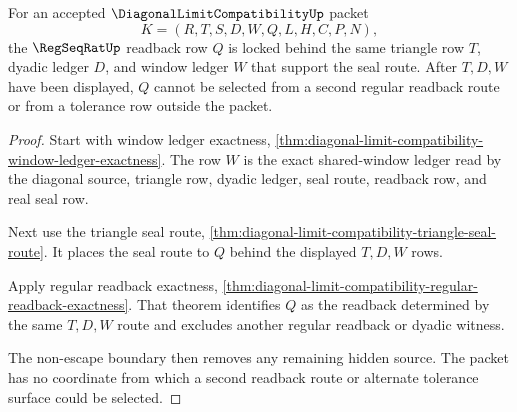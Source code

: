 \begin{theorem}
\label{thm:diagonal-limit-compatibility-triangle-readback-lock}
For an accepted $\DiagonalLimitCompatibilityUp$ packet
$$
K=(R,T,S,D,W,Q,L,H,C,P,N),
$$
the $\RegSeqRatUp$ readback row $Q$ is locked behind the same triangle row
$T$, dyadic ledger $D$, and window ledger $W$ that support the seal route.
After $T,D,W$ have been displayed, $Q$ cannot be selected from a second
regular readback route or from a tolerance row outside the packet.
\end{theorem}
\begin{proof}
Start with window ledger exactness,
\autoref{thm:diagonal-limit-compatibility-window-ledger-exactness}. The row
$W$ is the exact shared-window ledger read by the diagonal source, triangle
row, dyadic ledger, seal route, readback row, and real seal row.

Next use the triangle seal route,
\autoref{thm:diagonal-limit-compatibility-triangle-seal-route}. It places the
seal route to $Q$ behind the displayed $T,D,W$ rows.

Apply regular readback exactness,
\autoref{thm:diagonal-limit-compatibility-regular-readback-exactness}. That
theorem identifies $Q$ as the readback determined by the same $T,D,W$ route
and excludes another regular readback or dyadic witness.

The non-escape boundary then removes any remaining hidden source. The packet
has no coordinate from which a second readback route or alternate tolerance
surface could be selected.
\end{proof}

